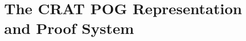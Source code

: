 \documentclass[letterpaper,USenglish,cleveref, autoref, thm-restate]{lipics-v2021}
\newcommand{\nil}{\bot}
\newcommand{\obar}[1]{\overline{#1}}
\begin{document}
\section{The CRAT POG Representation and Proof System}
\label{sect:crat}


\end{document}
